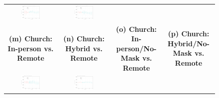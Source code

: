 \documentclass[9pt,twoside,lineno]{pnas-new}
\theoremstyle{definition}
\begin{document}
\begin{figure}[!ht]
{\begin{minipage}{\linewidth}
\begin{tabular}{cccc}
 \includegraphics[width=0.4\textwidth]{tables_and_figures/event_gym_csfullno.pdf}& \includegraphics[width=0.4\textwidth]{tables_and_figures/event_gym_cshybridno.pdf}  \smallskip\\ 
  \textbf{(m) Church: In-person vs. Remote }&\textbf{(n) Church: Hybrid vs. Remote}&\textbf{(o) Church: In-person/No-Mask vs. Remote}&\textbf{(p) Church:  Hybrid/No-Mask vs. Remote}\smallskip\\ 
 \includegraphics[width=0.4\textwidth]{tables_and_figures/event_church_csfull.pdf}& \includegraphics[width=0.4\textwidth]{tables_and_figures/event_church_cshybrid.pdf} 
 &

\end{tabular}
\end{minipage}}
\end{figure}
\end{document}
